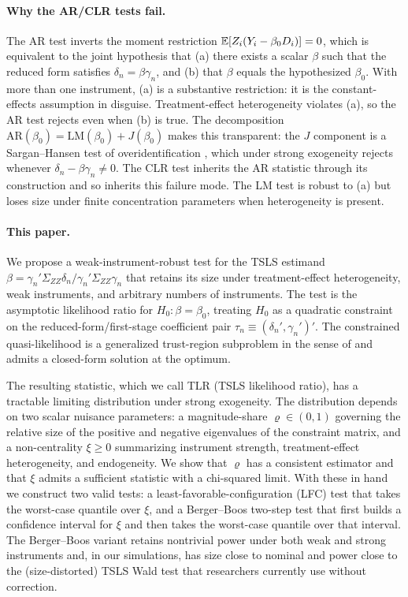 \paragraph*{Why the AR/CLR tests fail.}
The AR test inverts the moment restriction $\mathbb{E}[Z_i(Y_i - \beta_0 D_i)] = 0$, which is equivalent to the joint hypothesis that (a) there exists a scalar $\beta$ such that the reduced form satisfies $\delta_n = \beta\gamma_n$, and (b) that $\beta$ equals the hypothesized $\beta_0$. With more than one instrument, (a) is a substantive restriction: it is the constant-effects assumption in disguise. Treatment-effect heterogeneity violates (a), so the AR test rejects even when (b) is true. The decomposition $\mathrm{AR}(\beta_0) = \mathrm{LM}(\beta_0) + J(\beta_0)$ \citep{kleibergenGeneralizingWeakInstrument2007} makes this transparent: the $J$ component is a Sargan–Hansen test of overidentification \citep{sarganEstimationEconomicRelationships1958, hansenLargeSampleProperties1982}, which under strong exogeneity rejects whenever $\delta_n - \beta\gamma_n \neq 0$. The CLR test \citep{moreiraConditionalLikelihoodRatio2003} inherits the AR statistic through its construction and so inherits this failure mode. The LM test is robust to (a) but loses size under finite concentration parameters when heterogeneity is present.

\paragraph*{This paper.}
We propose a weak-instrument-robust test for the TSLS estimand $\beta = \gamma_n'\Sigma_{ZZ}\delta_n / \gamma_n'\Sigma_{ZZ}\gamma_n$ that retains its size under treatment-effect heterogeneity, weak instruments, and arbitrary numbers of instruments. The test is the asymptotic likelihood ratio for $H_0: \beta = \beta_0$, treating $H_0$ as a quadratic constraint on the reduced-form/first-stage coefficient pair $\tau_n \equiv (\delta_n', \gamma_n')'$. The constrained quasi-likelihood is a generalized trust-region subproblem in the sense of \cite{sternIndefiniteTrustRegion1995} and admits a closed-form solution at the optimum.

The resulting statistic, which we call TLR (TSLS likelihood ratio), has a tractable limiting distribution under strong exogeneity. The distribution depends on two scalar nuisance parameters: a magnitude-share $\varrho \in (0,1)$ governing the relative size of the positive and negative eigenvalues of the constraint matrix, and a non-centrality $\xi \geq 0$ summarizing instrument strength, treatment-effect heterogeneity, and endogeneity. We show that $\varrho$ has a consistent estimator and that $\xi$ admits a sufficient statistic with a chi-squared limit. With these in hand we construct two valid tests: a least-favorable-configuration (LFC) test that takes the worst-case quantile over $\xi$, and a Berger–Boos two-step test \citep{bergerValuesMaximizedConfidence1994} that first builds a confidence interval for $\xi$ and then takes the worst-case quantile over that interval. The Berger–Boos variant retains nontrivial power under both weak and strong instruments and, in our simulations, has size close to nominal and power close to the (size-distorted) TSLS Wald test that researchers currently use without correction.

